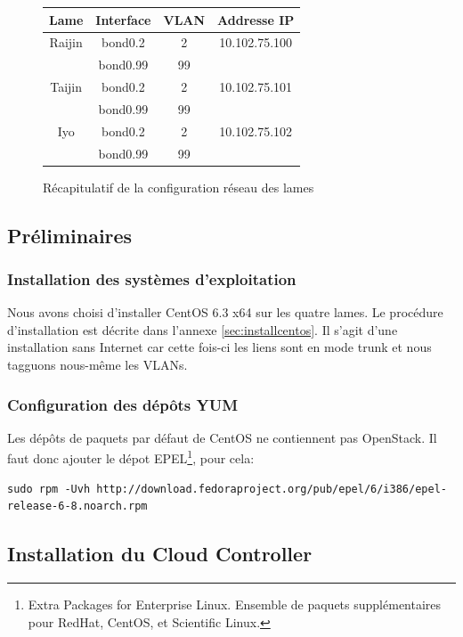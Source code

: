 \documentclass[a4paper,oneside]{report}
\begin{document}
\begin{figure}[h!]
\centering
\begin{tabular}{|c|c|c|c|}
\hline 
Lame & Interface & VLAN & Addresse IP \\ 
\hline 
Raijin & bond0.2 & 2 & 10.102.75.100 \\ 
\hline 
 & bond0.99 & 99 &  \\ 
\hline 
Taijin & bond0.2 & 2 & 10.102.75.101 \\ 
\hline 
 & bond0.99 & 99 &  \\ 
\hline 
Iyo & bond0.2 & 2 & 10.102.75.102 \\ 
\hline 
 & bond0.99 & 99 &  \\ 
\hline 
\end{tabular}
\caption{Récapitulatif de la configuration réseau des lames}
\end{figure}

\newpage
\subsection{Préliminaires}
\subsubsection{Installation des systèmes d'exploitation}
Nous avons choisi d'installer CentOS 6.3 x64 sur les quatre lames. Le procédure d'installation est décrite dans l'annexe \ref{sec:installcentos}.\newline
Il s'agit d'une installation sans Internet car cette fois-ci les liens sont en mode trunk et nous tagguons nous-même les VLANs.

\subsubsection{Configuration des dépôts YUM}
Les dépôts de paquets par défaut de CentOS ne contiennent pas OpenStack. Il faut donc ajouter le dépot EPEL\footnote{Extra Packages for Enterprise Linux. Ensemble de paquets supplémentaires pour RedHat, CentOS, et Scientific Linux.}, pour cela:
\begin{verbatim}
sudo rpm -Uvh http://download.fedoraproject.org/pub/epel/6/i386/epel-release-6-8.noarch.rpm
\end{verbatim}

\subsection{Installation du Cloud Controller}
\end{document}
